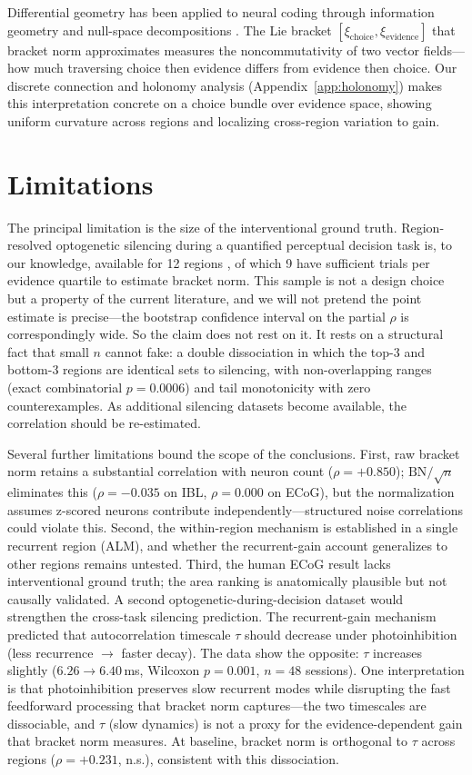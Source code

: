 \documentclass{article}
\begin{document}
Differential geometry has been applied to neural coding through information geometry \citep{amari2016information} and null-space decompositions \citep{kaufman2014cortical}. The Lie bracket $[\xi_{\text{choice}}, \xi_{\text{evidence}}]$ that bracket norm approximates measures the noncommutativity of two vector fields---how much traversing choice then evidence differs from evidence then choice. Our discrete connection and holonomy analysis (Appendix~\ref{app:holonomy}) makes this interpretation concrete on a choice bundle over evidence space, showing uniform curvature across regions and localizing cross-region variation to gain.

\section{Limitations}

The principal limitation is the size of the interventional ground truth. Region-resolved optogenetic silencing during a quantified perceptual decision task is, to our knowledge, available for 12 regions \citep{steinmetz2019distributed, zatkahaas2021}, of which 9 have sufficient trials per evidence quartile to estimate bracket norm. This sample is not a design choice but a property of the current literature, and we will not pretend the point estimate is precise---the bootstrap confidence interval on the partial $\rho$ is correspondingly wide. So the claim does not rest on it. It rests on a structural fact that small $n$ cannot fake: a double dissociation in which the top-3 and bottom-3 regions are identical sets to silencing, with non-overlapping ranges (exact combinatorial $p = 0.0006$) and tail monotonicity with zero counterexamples. As additional silencing datasets become available, the correlation should be re-estimated.

Several further limitations bound the scope of the conclusions. First, raw bracket norm retains a substantial correlation with neuron count ($\rho = +0.850$); $\text{BN}/\!\sqrt{n}$ eliminates this ($\rho = -0.035$ on IBL, $\rho = 0.000$ on ECoG), but the normalization assumes z-scored neurons contribute independently---structured noise correlations could violate this. Second, the within-region mechanism is established in a single recurrent region (ALM), and whether the recurrent-gain account generalizes to other regions remains untested. Third, the human ECoG result lacks interventional ground truth; the area ranking is anatomically plausible but not causally validated. A second optogenetic-during-decision dataset would strengthen the cross-task silencing prediction. The recurrent-gain mechanism predicted that autocorrelation timescale $\tau$ should decrease under photoinhibition (less recurrence $\to$ faster decay). The data show the opposite: $\tau$ increases slightly ($6.26 \to 6.40$\,ms, Wilcoxon $p = 0.001$, $n = 48$ sessions). One interpretation is that photoinhibition preserves slow recurrent modes while disrupting the fast feedforward processing that bracket norm captures---the two timescales are dissociable, and $\tau$ (slow dynamics) is not a proxy for the evidence-dependent gain that bracket norm measures. At baseline, bracket norm is orthogonal to $\tau$ across regions ($\rho = +0.231$, n.s.), consistent with this dissociation.
\end{document}
